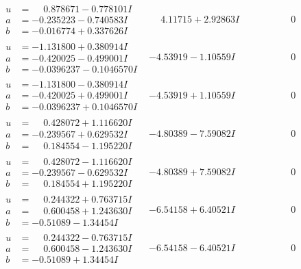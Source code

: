 \documentclass[1p]{elsarticle_modified}
\theoremstyle{definition}
\begin{document}
$$\begin{array}{c|c|c}
\begin{aligned}
u &= \phantom{-}0.878671 - 0.778101 I \\
a &= -0.235223 - 0.740583 I \\
b &= -0.016774 + 0.337626 I\end{aligned}
 & \phantom{-}4.11715 + 2.92863 I & \phantom{-0.000000 } 0 \\ \hline\begin{aligned}
u &= -1.131800 + 0.380914 I \\
a &= -0.420025 - 0.499001 I \\
b &= -0.0396237 - 0.1046570 I\end{aligned}
 & -4.53919 - 1.10559 I & \phantom{-0.000000 } 0 \\ \hline\begin{aligned}
u &= -1.131800 - 0.380914 I \\
a &= -0.420025 + 0.499001 I \\
b &= -0.0396237 + 0.1046570 I\end{aligned}
 & -4.53919 + 1.10559 I & \phantom{-0.000000 } 0 \\ \hline\begin{aligned}
u &= \phantom{-}0.428072 + 1.116620 I \\
a &= -0.239567 + 0.629532 I \\
b &= \phantom{-}0.184554 - 1.195220 I\end{aligned}
 & -4.80389 - 7.59082 I & \phantom{-0.000000 } 0 \\ \hline\begin{aligned}
u &= \phantom{-}0.428072 - 1.116620 I \\
a &= -0.239567 - 0.629532 I \\
b &= \phantom{-}0.184554 + 1.195220 I\end{aligned}
 & -4.80389 + 7.59082 I & \phantom{-0.000000 } 0 \\ \hline\begin{aligned}
u &= \phantom{-}0.244322 + 0.763715 I \\
a &= \phantom{-}0.600458 + 1.243630 I \\
b &= -0.51089 - 1.34454 I\end{aligned}
 & -6.54158 + 6.40521 I & \phantom{-0.000000 } 0 \\ \hline\begin{aligned}
u &= \phantom{-}0.244322 - 0.763715 I \\
a &= \phantom{-}0.600458 - 1.243630 I \\
b &= -0.51089 + 1.34454 I\end{aligned}
 & -6.54158 - 6.40521 I & \phantom{-0.000000 } 0 \\ \hline\begin{aligned}

\end{aligned}
\end{array}$$
\end{document}
